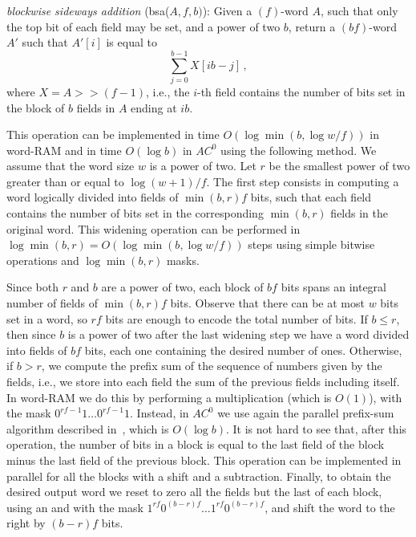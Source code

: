 \documentclass{llncs}
\def \band{\textsf{and}\xspace}
\newcommand{\fsize}{f}
\newcommand{\bsize}{b}
\newcommand{\len}{r}
\newcommand{\word}[1]{#1}
\newcommand{\fword}[1]{$(#1)$-word}
\begin{document}
\medskip
\noindent\emph{blockwise sideways addition} (\textsf{bsa}($\word{A},
\fsize, \bsize)$): Given a \fword{\fsize} $\word{A}$, such that only
the top bit of each field may be set, and a power of two $\bsize$,
return a \fword{b\fsize} $\word{A'}$ such that $\word{A'}[i]$ is equal to
$$
\sum_{j=0}^{\bsize-1} X[i\bsize - j]\,,
$$
where $X = A>> (\fsize - 1)$, i.e., the
$i$-th field contains the number of bits set in the block of
$\bsize$ fields in $\word{A}$ ending at $i\bsize$.
\smallskip

\noindent This operation can be implemented in time $O(\log
\min(b,\log w / \fsize))$ in word-RAM and in time $O(\log b)$ in
$AC^0$ using the following method. We assume that the word size $w$ is
a power of two.
Let $\len$ be the smallest power of two greater than or equal to
$\log (w + 1) / \fsize$. The first step consists in computing a word logically
divided into fields of $\min(\bsize, \len)\fsize$ bits, such that each
field contains the number of bits set in the corresponding
$\min(\bsize, \len)$ fields in the original word. This widening
operation can be performed in $\log \min(\bsize, \len) = O(\log
\min(b,\log w / \fsize))$ steps using simple bitwise operations and $\log \min(\bsize, \len)$ masks.

Since both $\len$ and $\bsize$ are a power of two, each block of $\bsize\fsize$ bits spans an
integral number of fields of $\min(\bsize, \len)\fsize$ bits. Observe
that there can be at most $w$ bits set in a word, so $\len\fsize$ bits
are enough to encode the total number of bits. If $\bsize \le \len$,
then since $\bsize$ is a power of two after the last widening step we
have a word divided into fields of $\bsize\fsize$ bits, each one
containing the desired number of ones. Otherwise, if $\bsize > \len$,
we compute the prefix sum of the sequence of numbers given by the
fields, i.e., we store into each field the sum of the previous fields
including itself. In word-RAM we do this by performing a
multiplication (which is $O(1)$), with the mask $0^{\len\fsize
  -1}1\ldots0^{\len\fsize -1}1$. Instead, in $AC^0$ we use again the
parallel prefix-sum algorithm described in~\cite{HS1986}, which is
$O(\log b)$. It is not hard to see that, after this operation, the
number of bits in a block is equal to the last field of the block
minus the last field of the previous block. This operation can be
implemented in parallel for all the blocks with a shift and a subtraction.
Finally, to obtain the desired output word we reset to zero all the
fields but the last of each block, using an \band with the mask
$1^{\len\fsize}0^{(\bsize - \len)\fsize}\ldots 1^{\len\fsize}0^{(\bsize -  \len)\fsize}$,
and shift the word to the right by $(\bsize - \len)\fsize$ bits.
\end{document}
